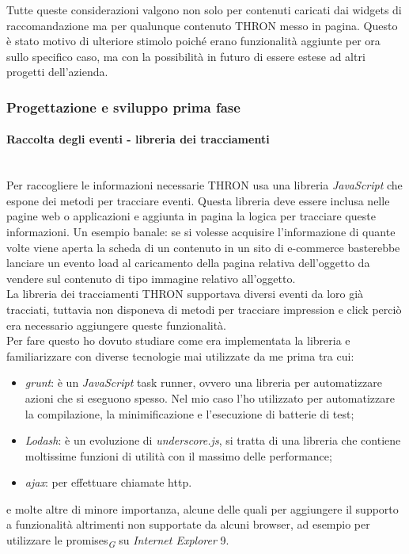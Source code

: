 \documentclass[a4paper, 12pt, twoside, openright]{book}
\newcommand{\gloss}[1]{#1\textsubscript{\textit{\tiny{G}}}}
\begin{document}
Tutte queste considerazioni valgono non solo per contenuti caricati dai widgets di raccomandazione ma per qualunque contenuto THRON messo in pagina. Questo è stato motivo di ulteriore stimolo poiché erano funzionalità aggiunte per ora sullo specifico caso, ma con la possibilità in futuro di essere estese ad altri progetti dell'azienda.

\subsubsection{Progettazione e sviluppo prima fase}

\paragraph{Raccolta degli eventi - libreria dei tracciamenti}\mbox{} \\
Per raccogliere le informazioni necessarie THRON usa una libreria \textit{JavaScript} che espone dei metodi per tracciare eventi. Questa libreria deve essere inclusa nelle pagine web o applicazioni e aggiunta in pagina la logica per tracciare queste informazioni. Un esempio banale: se si volesse acquisire l'informazione di quante volte viene aperta la scheda di un contenuto in un sito di e-commerce basterebbe lanciare un evento load al caricamento della pagina relativa dell'oggetto da vendere sul contenuto di tipo immagine relativo all'oggetto.\\

La libreria dei tracciamenti THRON supportava diversi eventi da loro già tracciati, tuttavia non disponeva di metodi per tracciare impression e click perciò era necessario aggiungere queste funzionalità.\\
Per fare questo ho dovuto studiare come era implementata la libreria e familiarizzare con diverse tecnologie mai utilizzate da me prima tra cui:
\begin{itemize}
\item \textit{grunt}: è un \textit{JavaScript} task runner, ovvero una libreria per automatizzare azioni che si eseguono spesso. Nel mio caso l'ho utilizzato per automatizzare la compilazione, la minimificazione e l'esecuzione di batterie di test;
\item \textit{Lodash}: è un evoluzione di \textit{underscore.js}, si tratta di una libreria che contiene moltissime funzioni di utilità con il massimo delle performance;
\item \textit{ajax}: per effettuare chiamate http.
\end{itemize}
e molte altre di minore importanza, alcune delle quali per aggiungere il supporto a funzionalità altrimenti non supportate da alcuni browser, ad esempio per utilizzare le \gloss{promises} su \textit{Internet Explorer} 9.\\
\end{document}
